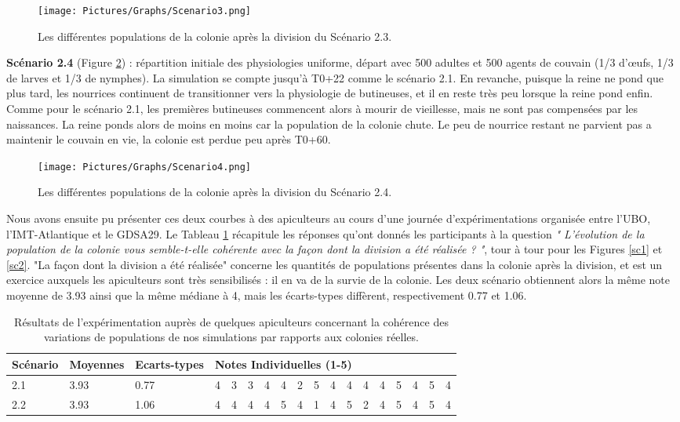 	\begin{figure}
	\centering
	\texttt{[image: Pictures/Graphs/Scenario3.png]}
	\caption{Les différentes populations de la colonie après la division du Scénario 2.3.}
	\label{sc3}
	\end{figure}
		
		\textbf{Scénario 2.4} (Figure \ref{sc4}) : répartition initiale des physiologies uniforme, départ avec 500 adultes et 500 agents de couvain (1/3 d'œufs, 1/3 de larves et 1/3 de nymphes). La simulation se compte jusqu'à T0+22 comme le scénario 2.1. En revanche, puisque la reine ne pond que plus tard, les nourrices continuent de transitionner vers la physiologie de butineuses, et il en reste très peu lorsque la reine pond enfin. Comme pour le scénario 2.1, les premières butineuses commencent alors à mourir de vieillesse, mais ne sont pas compensées par les naissances. La reine ponds alors de moins en moins car la population de la colonie chute. Le peu de nourrice restant ne parvient pas a maintenir le couvain en vie, la colonie est perdue peu après T0+60.
	
	\begin{figure}
	\centering
	\texttt{[image: Pictures/Graphs/Scenario4.png]}
	\caption{Les différentes populations de la colonie après la division du Scénario 2.4.}
	\label{sc4}
	\end{figure}
	
	Nous avons ensuite pu présenter ces deux courbes à des apiculteurs au cours d'une journée d'expérimentations organisée entre l'UBO, l'IMT-Atlantique et le GDSA29. Le Tableau \ref{TabResCoherence} récapitule les réponses qu'ont donnés les participants à la question \textit{" L'évolution de la population de la colonie vous semble-t-elle cohérente avec la façon dont la division a été réalisée ? "}, tour à tour pour les Figures \ref{sc1} et \ref{sc2}. "La façon dont la division a été réalisée" concerne les quantités de populations présentes dans la colonie après la division, et est un exercice auxquels les apiculteurs sont très sensibilisés : il en va de la survie de la colonie. Les deux scénario obtiennent alors la même note moyenne de 3.93 ainsi que la même médiane à 4, mais les écarts-types diffèrent, respectivement 0.77 et 1.06.
	
	
	\begin{table}
	\centering
	\begin{tabular}{l|l|l|lllllllllllllll}
	Scénario & Moyennes & Ecarts-types & \multicolumn{15}{l}{Notes Individuelles (1-5)}\\
	\hline
	2.1 & 3.93 & 0.77 &4&3&3&4&4&2&5&4&4&4&4&5&4&5&4\\
	2.2 & 3.93 & 1.06 &4&4&4&4&5&4&1&4&5&2&4&5&4&5&4\\	
	\end{tabular}
	\caption{Résultats de l'expérimentation auprès de quelques apiculteurs concernant la cohérence des variations de populations de nos simulations par rapports aux colonies réelles.}
	\label{TabResCoherence}
	\end{table}
	
